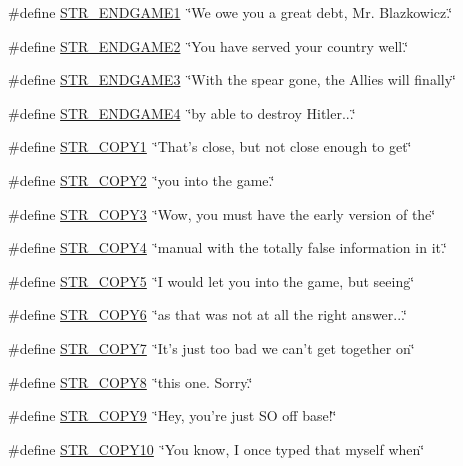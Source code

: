 \begin{DoxyCompactItemize}
\#define \hyperlink{F__SPEAR_8H_ac642f7e79ecc5bf2e7195dff032d9319}{STR\_\-ENDGAME1}~\char`\"{}We owe you a great debt, Mr. Blazkowicz.\char`\"{}
\item 
\#define \hyperlink{F__SPEAR_8H_ad33aeaabfd56af23ac9f931c1e4c92f4}{STR\_\-ENDGAME2}~\char`\"{}You have served your country well.\char`\"{}
\item 
\#define \hyperlink{F__SPEAR_8H_a913c602f9da78106a326e522b1361173}{STR\_\-ENDGAME3}~\char`\"{}With the spear gone, the Allies will finally\char`\"{}
\item 
\#define \hyperlink{F__SPEAR_8H_ad71b737f16d02c1e63c6190075f81ff6}{STR\_\-ENDGAME4}~\char`\"{}by able to destroy Hitler...\char`\"{}
\item 
\#define \hyperlink{F__SPEAR_8H_acd1ea4a1395a330839831fe06c62b8f8}{STR\_\-COPY1}~\char`\"{}That's close, but not close enough to get\char`\"{}
\item 
\#define \hyperlink{F__SPEAR_8H_a670b8012eb0974b72ab49e5202f722eb}{STR\_\-COPY2}~\char`\"{}you into the game.\char`\"{}
\item 
\#define \hyperlink{F__SPEAR_8H_adba1081b6e149c0c3f799b8a359d9e04}{STR\_\-COPY3}~\char`\"{}Wow, you must have the early version of the\char`\"{}
\item 
\#define \hyperlink{F__SPEAR_8H_a2790b0934af47a38803c5e05d2ebc49d}{STR\_\-COPY4}~\char`\"{}manual with the totally false information in it.\char`\"{}
\item 
\#define \hyperlink{F__SPEAR_8H_adffe4523d436e765eb75160d1fdf3a63}{STR\_\-COPY5}~\char`\"{}I would let you into the game, but seeing\char`\"{}
\item 
\#define \hyperlink{F__SPEAR_8H_a5e55c53fa4d56d59b6244a063bfd691f}{STR\_\-COPY6}~\char`\"{}as that was not at all the right answer...\char`\"{}
\item 
\#define \hyperlink{F__SPEAR_8H_a854b8416c000b973e2e0c5e2028c653f}{STR\_\-COPY7}~\char`\"{}It's just too bad we can't get together on\char`\"{}
\item 
\#define \hyperlink{F__SPEAR_8H_aee09d5bf07af1a8645fc99d8ef76e9b4}{STR\_\-COPY8}~\char`\"{}this one.  Sorry.\char`\"{}
\item 
\#define \hyperlink{F__SPEAR_8H_a0ba3d47c780fed44b2788f0bb7e8dc8e}{STR\_\-COPY9}~\char`\"{}Hey, you're just SO off base!\char`\"{}
\item 
\#define \hyperlink{F__SPEAR_8H_a9ab3d7b0b0aed9754f6acc5c13ce5827}{STR\_\-COPY10}~\char`\"{}You know, I once typed that myself when\char`\"{}
\item 

\end{DoxyCompactItemize}
